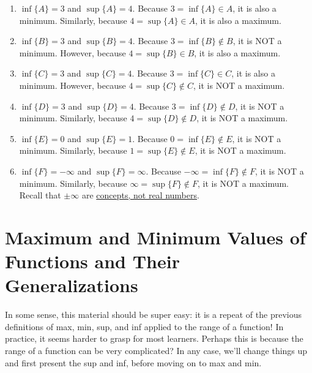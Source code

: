 \begin{enumerate}
\renewcommand{\labelenumi}{(\alph{enumi})}
\setlength{\itemsep}{.2cm}
    \item  \Ans $\inf\{A\} = 3$ and  $\sup\{A\} = 4$. Because  $3 = \inf\{A\} \in A$, it is also a minimum. Similarly, because  $4 = \sup\{A\} \in A$, it is also a maximum.

    \item  \Ans $\inf\{B\} =3$ and $\sup\{B\} = 4$. Because  $3 = \inf\{B\} \notin B$, it is NOT a minimum. However, because  $4 = \sup\{B\} \in B$, it is also a maximum.

    \item  \Ans $\inf\{C\} =3$ and $\sup\{C\} = 4$. Because  $3 = \inf\{C\} \in C$, it is also a minimum. However, because  $4 = \sup\{C\} \notin C$, it is NOT a maximum.

    \item \Ans $\inf\{D\} =3$ and $\sup\{D\} = 4$. Because  $3 = \inf\{D\} \notin D$, it is NOT a minimum. Similarly, because  $4 = \sup\{D\} \notin D$, it is NOT a maximum.

    \item \Ans $\inf\{E\} =0$ and $\sup\{E\} = 1$. Because  $0 = \inf\{E\} \notin E$, it is NOT a minimum. Similarly, because  $1 = \sup\{E\} \notin E$, it is NOT a maximum.
    
    \item \Ans $\inf\{F\} = -\infty$ and  $\sup\{F\} = \infty$. Because  $-\infty= \inf\{F\} \notin F$, it is NOT a minimum. Similarly, because  $\infty = \sup\{F\} \notin F$, it is NOT a maximum. Recall that $\pm \infty$ are \ul{concepts, not real numbers}. 
    
\end{enumerate}

\Qed

\bigskip

\section{Maximum and Minimum Values of Functions and Their Generalizations}
    
In some sense, this material should be super easy: it is a repeat of the previous definitions of max, min, sup, and inf applied to the range of a function! In practice, it seems harder to grasp for most learners. Perhaps this is because the range of a function can be very complicated? In any case, we'll change things up and first present the sup and inf, before moving on to max and min.

